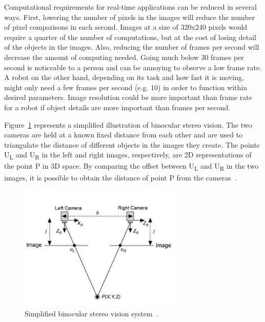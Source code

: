 Computational requirements for real-time applications can be reduced in several ways. First, lowering the number of pixels in the images will reduce the number of pixel comparisons in each second. Images at a size of 320x240 pixels would require a quarter of the number of computations, but at the cost of losing detail of the objects in the images. Also, reducing the number of frames per second will decrease the amount of computing needed. Going much below 30 frames per second is noticeable to a person and can be annoying to observe a low frame rate. A robot on the other hand, depending on its task and how fast it is moving, might only need a few frames per second (e.g. 10) in order to function within desired parameters. Image resolution could be more important than frame rate for a robot if object details are more important than frames per second.

Figure~\ref{fig:sv_diagram} represents a simplified illustration of binocular stereo vision. The two cameras are held at a known fixed distance from each other and are used to triangulate the distance of different objects in the images they create. The points U\textsubscript{L} and U\textsubscript{R} in the left and right images, respectively, are 2D representations of the point P in 3D space. By comparing the offset between U\textsubscript{L} and U\textsubscript{R} in the two images, it is possible to obtain the distance of point P from the cameras~\cite{stereoVisionDiagram}.

\begin{figure}[h]
	\begin{center}
		\includegraphics[height=60mm]{figures/stereoVisionDiagram.jpg}
		\captionfonts
		\caption{Simplified binocular stereo vision system~\cite{stereoVisionDiagram}.}
		\label{fig:sv_diagram}
	\end{center}
\end{figure}

